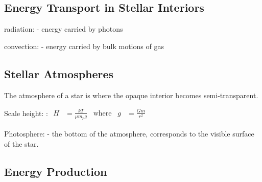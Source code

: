 \documentclass[a4paper, 11pt, landscape]{article}
\begin{document}
\begin{multicols*}{3}
\subsection{Energy Transport in Stellar Interiors}
\begin{compactenum}
	\item [\color{red}radiation:] - energy carried by photons
	\item [\color{red}convection:] - energy carried by bulk motions of gas
\end{compactenum}

\subsection{Stellar Atmospheres}
The atmosphere of a star is where the opaque interior becomes semi-transparent.
\begin{compactenum}
	\item [\color{red}Scale height:]: 
	$\begin{aligned*}
	    H &= \frac{kT}{\mu m_{p} g} \;\;\; \text{where} \;\;\; g &= \frac{Gm}{r^{2}}
	\end{aligned*}$
	\item [\color{red}Photosphere:] - the bottom of the atmosphere, corresponds to the visible surface of the star.
\end{compactenum}

\subsection{Energy Production}
\begin{compactenum}
	\item 
\end{compactenum}


\end{multicols*}
\end{document}
